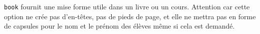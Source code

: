 %

\verb+book+ fournit une mise forme utile dans un livre ou un cours. Attention car cette option ne crée pas d'en-têtes, pas de pieds de page, et elle ne mettra pas en forme de capsules pour le nom et le prénom des élèves même si cela est demandé.

